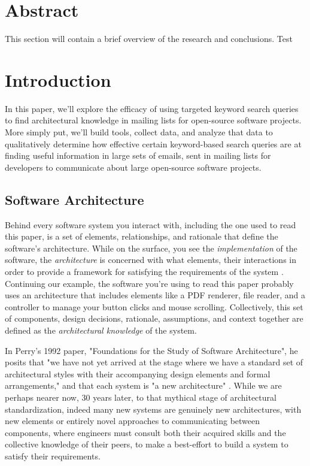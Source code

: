 \documentclass[a4paper, 12pt]{article}
\begin{document}


\section{Abstract}
	This section will contain a brief overview of the research and conclusions. Test



\section{Introduction}
	In this paper, we'll explore the efficacy of using targeted keyword search queries to find architectural knowledge in mailing lists for open-source software projects. More simply put, we'll build tools, collect data, and analyze that data to qualitatively determine how effective certain keyword-based search queries are at finding useful information in large sets of emails, sent in mailing lists for developers to communicate about large open-source software projects.
	
	\subsection{Software Architecture}
		Behind every software system you interact with, including the one used to read this paper, is a set of elements, relationships, and rationale that define the software's architecture. While on the surface, you see the \textit{implementation} of the software, the \textit{architecture} is concerned with what elements, their interactions in order to provide a framework for satisfying the requirements of the system \autocite{perry}. Continuing our example, the software you're using to read this paper probably uses an architecture that includes elements like a PDF renderer, file reader, and a controller to manage your button clicks and mouse scrolling. Collectively, this set of components, design decisions, rationale, assumptions, and context together are defined as the \textit{architectural knowledge} of the system\autocite{denboon}.
		
		In Perry's 1992 paper, "Foundations for the Study of Software Architecture", he posits that "we have not yet arrived at the stage where we have a standard set of architectural styles with their accompanying design elements and formal arrangements," and that each system is "a new architecture" \autocite{perry}. While we are perhaps nearer now, 30 years later, to that mythical stage of architectural standardization, indeed many new systems are genuinely new architectures, with new elements or entirely novel approaches to communicating between components, where engineers must consult both their acquired skills and the collective knowledge of their peers, to make a best-effort to build a system to satisfy their requirements.
		
\end{document}

